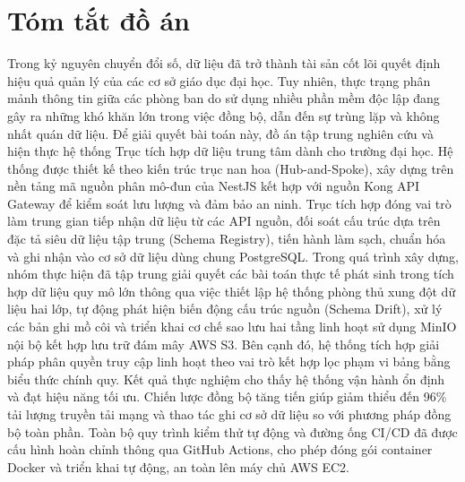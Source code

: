 \section*{Tóm tắt đồ án}
Trong kỷ nguyên chuyển đổi số, dữ liệu đã trở thành tài sản cốt lõi quyết định hiệu quả quản lý của các cơ sở giáo dục đại học. Tuy nhiên, thực trạng phân mảnh thông tin giữa các phòng ban do sử dụng nhiều phần mềm độc lập đang gây ra những khó khăn lớn trong việc đồng bộ, dẫn đến sự trùng lặp và không nhất quán dữ liệu.
Để giải quyết bài toán này, đồ án tập trung nghiên cứu và hiện thực hệ thống Trục tích hợp dữ liệu trung tâm dành cho trường đại học. Hệ thống được thiết kế theo kiến trúc trục nan hoa (Hub-and-Spoke), xây dựng trên nền tảng mã nguồn phân mô-đun của NestJS kết hợp với nguồn Kong API Gateway để kiểm soát lưu lượng và đảm bảo an ninh. Trục tích hợp đóng vai trò làm trung gian tiếp nhận dữ liệu từ các API nguồn, đối soát cấu trúc dựa trên đặc tả siêu dữ liệu tập trung (Schema Registry), tiến hành làm sạch, chuẩn hóa và ghi nhận vào cơ sở dữ liệu dùng chung PostgreSQL.
Trong quá trình xây dựng, nhóm thực hiện đã tập trung giải quyết các bài toán thực tế phát sinh trong tích hợp dữ liệu quy mô lớn thông qua việc thiết lập hệ thống phòng thủ xung đột dữ liệu hai lớp, tự động phát hiện biến động cấu trúc nguồn (Schema Drift), xử lý các bản ghi mồ côi và triển khai cơ chế sao lưu hai tầng linh hoạt sử dụng MinIO nội bộ kết hợp lưu trữ đám mây AWS S3. Bên cạnh đó, hệ thống tích hợp giải pháp phân quyền truy cập linh hoạt theo vai trò kết hợp lọc phạm vi bảng bằng biểu thức chính quy.
Kết quả thực nghiệm cho thấy hệ thống vận hành ổn định và đạt hiệu năng tối ưu. Chiến lược đồng bộ tăng tiến giúp giảm thiểu đến 96\% tải lượng truyền tải mạng và thao tác ghi cơ sở dữ liệu so với phương pháp đồng bộ toàn phần. Toàn bộ quy trình kiểm thử tự động và đường ống CI/CD đã được cấu hình hoàn chỉnh thông qua GitHub Actions, cho phép đóng gói container Docker và triển khai tự động, an toàn lên máy chủ AWS EC2.

\newpage

